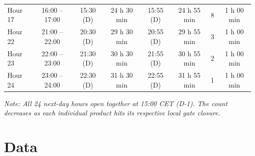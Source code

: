 \begin{appendix}
\begin{table}[htbp]
{\begin{tabular}{l c c c c c c c}
            Hour 17          & 16:00 -- 17:00          & 15:30 (D)             & 24 h 30 min               & 15:55 (D)             & 24 h 55 min               & 8                         & 1 h 00 min                \\
            Hour 22          & 21:00 -- 22:00          & 20:30 (D)             & 29 h 30 min               & 20:55 (D)             & 29 h 55 min               & 3                         & 1 h 00 min                \\
            Hour 23          & 22:00 -- 23:00          & 21:30 (D)             & 30 h 30 min               & 21:55 (D)             & 30 h 55 min               & 2                         & 1 h 00 min                \\
            Hour 24          & 23:00 -- 24:00          & 22:30 (D)             & 31 h 30 min               & 22:55 (D)             & 31 h 55 min               & 1                         & 1 h 00 min                \\
            \bottomrule
        \end{tabular}}
        \vfill
        \footnotesize\textit{Note: All 24 next-day hours open together at 15:00 CET (D-1). The count decreases as each individual product hits its respective local gate closure.}
        \label{tab:epex_parallel_durations}
    \end{table}

    \chapter{Data}\label{anhang2}

\end{appendix}
